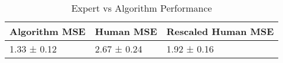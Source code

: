 \begin{table}[!htbp]
\centering
\caption{Expert vs Algorithm Performance} 
\label{tab: human v algo performance}
\begin{tabular}{lll}
  \toprule Algorithm MSE & Human MSE & Rescaled Human MSE \\ 
  \midrule 1.33 ± 0.12 & 2.67 ± 0.24 & 1.92 ± 0.16 \\ 
   \bottomrule \end{tabular}
\end{table}

